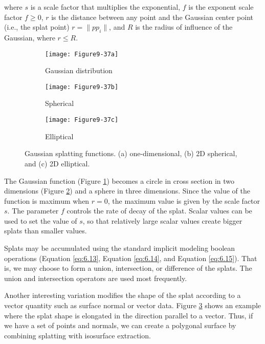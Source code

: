 \begin{description}[leftmargin=0cm,labelindent=0cm]
\noindent where $s$ is a scale factor that multiplies the exponential, $f$ is the exponent scale factor $f \geq 0$, $r$ is the distance between any point and the Gaussian center point (i.e., the splat point) $r = \| p p_i \|$, and $R$ is the radius of influence of the Gaussian, where $r \leq R$.

\begin{figure}[htb]
    \centering
	\begin{subfigure}[h]{0.32\linewidth}
		\texttt{[image: Figure9-37a]}
		\captionsetup{justification=centering}
		\caption{Gaussian distribution}
		\label{fig:Figure9-37a}
	\end{subfigure}
	\hfill
	\begin{subfigure}[h]{0.32\linewidth}
		\texttt{[image: Figure9-37b]}
		\captionsetup{justification=centering}
		\caption{Spherical}
		\label{fig:Figure9-37b}
	\end{subfigure}
	\hfill
	\begin{subfigure}[h]{0.32\linewidth}
		\texttt{[image: Figure9-37c]}
		\captionsetup{justification=centering}
		\caption{Elliptical}
		\label{fig:Figure9-37c}
	\end{subfigure}
	\caption{Gaussian splatting functions. (a) one-dimensional, (b) 2D spherical, and (c) 2D elliptical.}\label{fig:Figure9-37}
\end{figure}

The Gaussian function (Figure \ref{fig:Figure9-37a}) becomes a circle in cross section in two dimensions (Figure \ref{fig:Figure9-37b}) and a sphere in three dimensions. Since the value of the function is maximum when $r = 0$, the maximum value is given by the scale factor $s$. The parameter $f$ controls the rate of decay of the splat. Scalar values can be used to set the value of $s$, so that relatively large scalar values create bigger splats than smaller values.

Splats may be accumulated using the standard implicit modeling boolean operations (Equation \ref{eq:6.13}, Equation \ref{eq:6.14}, and Equation \ref{eq:6.15}). That is, we may choose to form a union, intersection, or difference of the splats. The union and intersection operators are used most frequently.

Another interesting variation modifies the shape of the splat according to a vector quantity such as surface normal or vector data. Figure \ref{fig:Figure9-37c} shows an example where the splat shape is elongated in the direction parallel to a vector. Thus, if we have a set of points and normals, we can create a polygonal surface by combining splatting with isosurface extraction.


\end{description}
